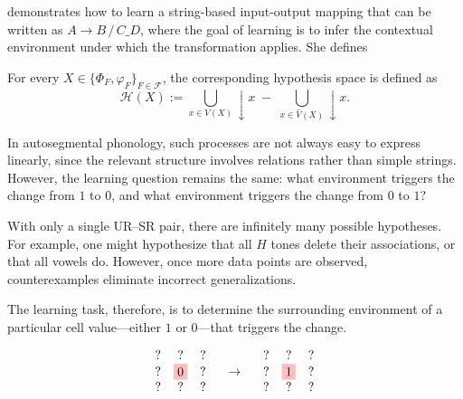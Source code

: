 \documentclass[pmlr]{jmlr}%
\begin{document}
\citet{yolyan2025logical} demonstrates how to learn a 
string-based input-output mapping that can be written as
 $A \rightarrow B \,/\, C \_ D$, where the goal
of learning is to infer the contextual environment
under which the transformation applies. She defines

\begin{definition}
For every $X \in \{\Phi_F,\varphi_F\}_{F \in \mathcal{F}}$,
the corresponding hypothesis space is defined as
\[
\mathcal{H}(X) :=
\bigcup_{x \in V(X)} \downarrow x
\;-\;
\bigcup_{x \in \hat{V}(X)} \downarrow x .
\]
\end{definition}

In autosegmental phonology, such
processes are not always easy to express linearly, since the relevant
structure involves relations rather than simple strings. However, the
learning question remains the same: what environment triggers the
change from \(1\) to \(0\), and what environment triggers the change
from \(0\) to \(1\)?







With only a single UR--SR pair, there are infinitely many possible
hypotheses. For example, one might hypothesize that all \(H\) tones
delete their associations, or that all vowels do. However, once more
data points are observed, counterexamples eliminate incorrect
generalizations.

The learning task, therefore, is to determine the surrounding
environment of a particular cell value—either \(1\) or \(0\)—that
triggers the change.

\[
\begin{array}{ccc}
	? & ? & ? \\
	? & \colorbox{pink}{0} & ? \\
	? & ? & ?
\end{array}
\quad \rightarrow \quad
\begin{array}{ccc}
	? & ? & ? \\
	? & \colorbox{pink}{1} & ? \\
	? & ? & ?
\end{array}
\]
\end{document}
